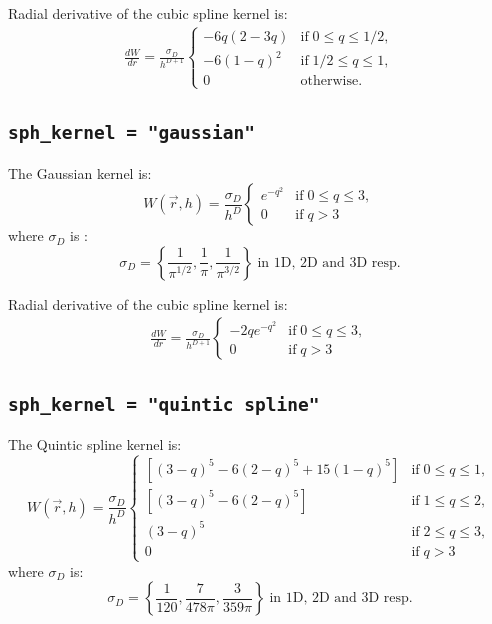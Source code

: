 \documentclass[notes.tex]{subfiles}
\begin{document}
Radial derivative of the cubic spline kernel is:
\begin{align}
 \frac{dW}{dr} = \frac{\sigma_D}{h^{D+1}} 
  \begin{cases}
   -6q(2 - 3q)  & \text{if} \; 0 \leq q \leq 1/2, \\
   -6(1 - q)^2  & \text{if} \; 1/2 \leq q \leq 1, \\
    0           & \text{otherwise}.
\end{cases}
\end{align}

\subsection{{\tt sph\_kernel = "gaussian"}}
The Gaussian kernel is:
\begin{equation}
W(\vec{r},h) = \frac{\sigma_D}{h^D} 
  \begin{cases}
    e^{-q^2} & \text{if} \; 0 \leq q \leq 3, \\
    0        & \text{if} \;  q >3 
\end{cases}
\end{equation}
where $\sigma_D$ is :
\begin{equation}
\sigma_D =  \left\{ \frac{1}{\pi^{1/2}}, \frac{1}{\pi},\frac{1}{\pi^{3/2}}\right\}
         \; \text{in 1D, 2D and 3D resp.}
\end{equation}

Radial derivative of the cubic spline kernel is:
\begin{align}
 \frac{dW}{dr} = \frac{\sigma_D}{h^{D+1}} 
   \begin{cases}
    -2 q e^{-q^2} & \text{if} \; 0 \leq q \leq 3, \\
    0        & \text{if} \;  q >3 
\end{cases}
\end{align}

\subsection{{\tt sph\_kernel = "quintic spline"}}
The Quintic spline kernel is:
\begin{equation}
W(\vec{r},h) = \frac{\sigma_D}{h^D} 
  \begin{cases}
    [(3-q)^5-6(2-q)^5+15(1-q)^5] & \text{if} \; 0 \leq q \leq 1, \\
    [(3-q)^5 - 6(2-q)^5] & \text{if} \; 1 \leq q \leq 2, \\
    (3-q)^5 & \text{if} \; 2 \leq q \leq 3, \\
    0        & \text{if} \;  q >3 
\end{cases}
\end{equation}
where $\sigma_D$ is:
\begin{equation}
\sigma_D =  \left\{ \frac{1}{120}, \frac{7}{478\pi}, \frac{3}{359\pi}\right\}
         \; \text{in 1D, 2D and 3D resp.}
\end{equation}
\end{document}
